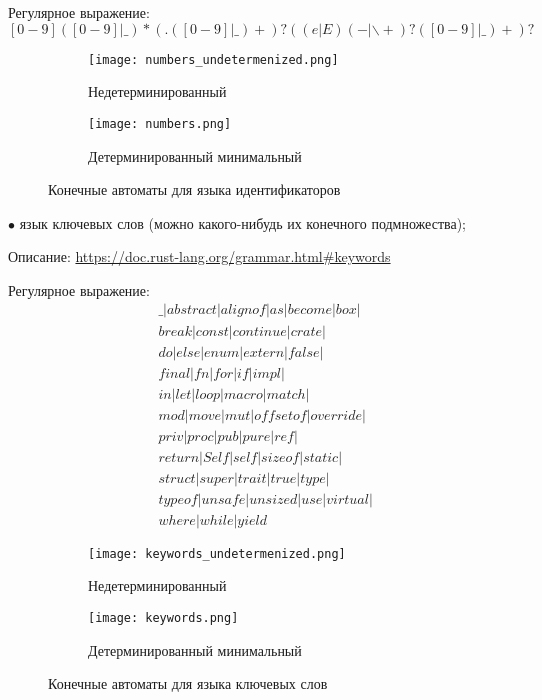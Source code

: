 Регулярное выражение: $[0-9]([0-9]|\_)*(.([0-9]|\_)+)?((e|E)(-|\backslash+)?([0-9]|\_)+)?$

\begin{figure}[h]
    \centering
    \begin{subfigure}[b]{0.8\linewidth}
      \texttt{[image: numbers\_undetermenized.png]}
      \caption{Недетерминированный}
    \end{subfigure}
    \begin{subfigure}[b]{0.8\linewidth}
      \texttt{[image: numbers.png]}
      \caption{Детерминированный минимальный}
    \end{subfigure}
    \caption{Конечные автоматы для языка идентификаторов}
\end{figure}

\break

$\bullet$ язык ключевых слов (можно какого-нибудь их конечного подмножества);

Описание: \url{https://doc.rust-lang.org/grammar.html#keywords}

Регулярное выражение: 
\begin{align*}
    &\_|abstract|alignof|as|become|box|\\
    &break|const|continue|crate|\\
    &do|else|enum|extern|false|\\
    &final|fn|for|if|impl|\\
    &in|let|loop|macro|match|\\
    &mod|move|mut|offsetof|override|\\
    &priv|proc|pub|pure|ref|\\
    &return|Self|self|sizeof|static|\\
    &struct|super|trait|true|type|\\
    &typeof|unsafe|unsized|use|virtual|\\
    &where|while|yield 
\end{align*}

\begin{figure}[h]
    \centering
    \begin{subfigure}[b]{0.4\linewidth}
      \texttt{[image: keywords\_undetermenized.png]}
      \caption{Недетерминированный}
    \end{subfigure}
    \begin{subfigure}[b]{0.4\linewidth}
      \texttt{[image: keywords.png]}
      \caption{Детерминированный минимальный}
    \end{subfigure}
    \caption{Конечные автоматы для языка ключевых слов}
\end{figure}

